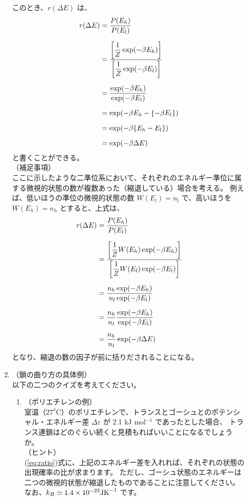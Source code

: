 \documentclass[uplatex,dvipdfmx,a4paper,11pt, titlepage]{jsarticle}
\begin{document}
\begin{itemize}
\begin{enumerate}
		このとき、$r(\Delta E)$ は、
		\begin{align*}
		r(\Delta E)
			&= \dfrac{P(E_h)}{P(E_l)} \notag \\[6pt]
			&=\dfrac{\left[ \dfrac{1}{Z} \exp(-\beta E_h) \right] }{\left[ \dfrac{1}{Z} \exp(-\beta E_l) \right]} \notag \\[6pt]
			&=\dfrac{\exp(-\beta E_h) }{\exp(-\beta E_l)} \notag \\[6pt]
			&=\exp(-\beta E_h - \{-\beta E_l \}) \notag \\[6pt]
			&=\exp(-\beta \{E_h - E_l \}) \notag \\[6pt]
			&=\exp(-\beta \Delta E)
		\end{align*}
		と書くことができる。\\
		（補足事項）\\
		ここに示したような二準位系において、それぞれのエネルギー準位に属する微視的状態の数が複数あった（縮退している）場合を考える。
		例えば、低いほうの準位の微視的状態の数 $W(E_l) = n_l$ で、高いほうを $W(E_h) = n_h$ とすると、上式は、
		\begin{align*}
		r(\Delta E)
			&= \dfrac{P(E_h)}{P(E_l)} \notag \\[6pt]
			&=\dfrac{\left[ \dfrac{1}{Z} W(E_h) \exp(-\beta E_h) \right] }{\left[ \dfrac{1}{Z} W(E_l) \exp(-\beta E_l) \right]} \notag \\[6pt]
			&=\dfrac{n_h \exp(-\beta E_h) }{n_l \exp(-\beta E_l)} \notag \\[6pt]
			&=\dfrac{n_h}{n_l} \dfrac{\exp(-\beta E_h) }{\exp(-\beta E_l)} \notag \\[6pt]
			&=\dfrac{n_h}{n_l} \exp(-\beta \Delta E)
		\end{align*}
		となり、縮退の数の因子が前に括りだされることになる。

		\item
		（鎖の曲り方の具体例）\\
		以下の二つのクイズを考えてください。

		\begin{enumerate}
			\item
			（ポリエチレンの例）\\
			室温（$27^o$C）のポリエチレンで、トランスとゴーシュとのポテンシャル・エネルギー差 $\Delta \varepsilon$ が 2.1 kJ mol$^{-1}$ であったとした場合、
			トランス連鎖はどのぐらい続くと見積もればいいことになるでしょうか。\\
			（ヒント）\\
			(\ref{eq:ratio})式に、上記のエネルギー差を入れれば、それぞれの状態の出現確率の比が求まります。
			ただし、ゴーシュ状態のエネルギーは二つの微視的状態が縮退したものであることに注意してください。
			なお、$k_B \simeq 1.4 \times 10^{-23} {\rm J K}^{-1}$ です。 


\end{enumerate}
\end{enumerate}
\end{itemize}
\end{document}
